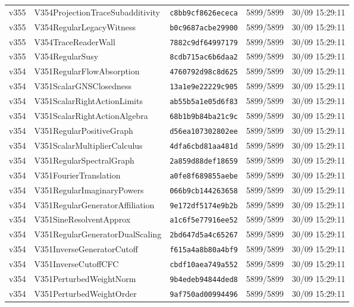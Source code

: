 \documentclass[11pt]{article}
\theoremstyle{definition}\newtheorem{deriv}{Derivação}
\begin{document}
{\begin{longtable}{@{}lllll@{}}
v355 & V354ProjectionTraceSubadditivity & \texttt{c8bb9cf8626ececa} & 5899/5899 & 30/09 15:29:11 \\
v355 & V354RegularLegacyWitness & \texttt{b0c9687acbe29900} & 5899/5899 & 30/09 15:29:11 \\
v355 & V354TraceReaderWall & \texttt{7882c9df64997179} & 5899/5899 & 30/09 15:29:11 \\
v355 & V354RegularSusy & \texttt{8cdb715ac6b6daa2} & 5899/5899 & 30/09 15:29:11 \\
v354 & V351RegularFlowAbsorption & \texttt{4760792d98c8d625} & 5899/5899 & 30/09 15:29:11 \\
v354 & V351ScalarGNSClosedness & \texttt{13a1e9e22229c905} & 5899/5899 & 30/09 15:29:11 \\
v354 & V351ScalarRightActionLimits & \texttt{ab55b5a1e05d6f83} & 5899/5899 & 30/09 15:29:11 \\
v354 & V351ScalarRightActionAlgebra & \texttt{68b1b9b84ba21c9c} & 5899/5899 & 30/09 15:29:11 \\
v354 & V351RegularPositiveGraph & \texttt{d56ea107302802ee} & 5899/5899 & 30/09 15:29:11 \\
v354 & V351ScalarMultiplierCalculus & \texttt{4dfa6cbd81aa481d} & 5899/5899 & 30/09 15:29:11 \\
v354 & V351RegularSpectralGraph & \texttt{2a859d88def18659} & 5899/5899 & 30/09 15:29:11 \\
v354 & V351FourierTranslation & \texttt{a0fe8f689855aebe} & 5899/5899 & 30/09 15:29:11 \\
v354 & V351RegularImaginaryPowers & \texttt{066b9cb144263658} & 5899/5899 & 30/09 15:29:11 \\
v354 & V351RegularGeneratorAffiliation & \texttt{9e172df5174e9b2b} & 5899/5899 & 30/09 15:29:11 \\
v354 & V351SineResolventApprox & \texttt{a1c6f5e77916ee52} & 5899/5899 & 30/09 15:29:11 \\
v354 & V351RegularGeneratorDualScaling & \texttt{2bd647d5a4c65267} & 5899/5899 & 30/09 15:29:11 \\
v354 & V351InverseGeneratorCutoff & \texttt{f615a4a8b80a4bf9} & 5899/5899 & 30/09 15:29:11 \\
v354 & V351InverseCutoffCFC & \texttt{cbdf10aea749a552} & 5899/5899 & 30/09 15:29:11 \\
v354 & V351PerturbedWeightNorm & \texttt{9b4edeb94844ded8} & 5899/5899 & 30/09 15:29:11 \\
v354 & V351PerturbedWeightOrder & \texttt{9af750ad00994496} & 5899/5899 & 30/09 15:29:11 \\

\end{longtable}}
\end{document}

